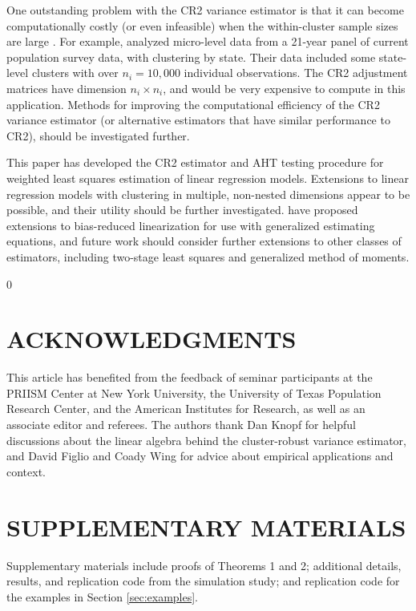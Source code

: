\documentclass[12pt]{article}\usepackage[]{graphicx}\usepackage[]{color}
\newcommand{\blind}{0}
\begin{document}
One outstanding problem with the CR2 variance estimator is that it can become computationally costly (or even infeasible) when the within-cluster sample sizes are large \citep{Mackinnon2015wildCIs}. 
For example, \citet{Bertrand2004how} analyzed micro-level data from a 21-year panel of current population survey data, with clustering by state. Their data included some state-level clusters with over $n_i = 10,000$ individual observations. 
The CR2 adjustment matrices have dimension $n_i \times n_i$, and would be very expensive to compute in this application. 
Methods for improving the computational efficiency of the CR2 variance estimator (or alternative estimators that have similar performance to CR2), should be investigated further. 

This paper has developed the CR2 estimator and AHT testing procedure for weighted least squares estimation of linear regression models. 
Extensions to linear regression models with clustering in multiple, non-nested dimensions \citep[cf.][]{Cameron2011robust} appear to be possible, and their utility should be further investigated. 
\citet{McCaffrey2006improved} have proposed extensions to bias-reduced linearization for use with generalized estimating equations, and future work should consider further extensions to other classes of estimators, including two-stage least squares and generalized method of moments. 

\blind
{
\section*{ACKNOWLEDGMENTS}

This article has benefited from the feedback of seminar participants at the PRIISM Center at New York University, the University of Texas Population Research Center, and the American Institutes for Research, as well as an associate editor and referees. The authors thank Dan Knopf for helpful discussions about the linear algebra behind the cluster-robust variance estimator, and David Figlio and Coady Wing for advice about empirical applications and context.
} \fi

\section*{SUPPLEMENTARY MATERIALS}

Supplementary materials include proofs of Theorems 1 and 2; additional details, results, and replication code from the simulation study; and replication code for the examples in Section \ref{sec:examples}.



\end{document}
